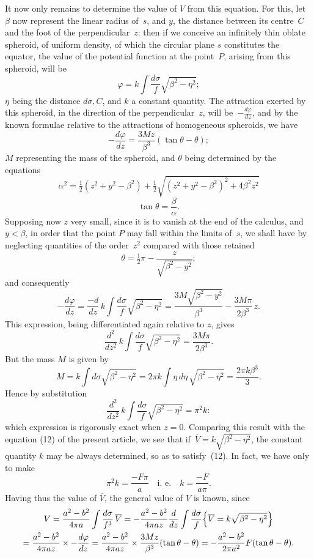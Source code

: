 \documentclass[12pt,notitlepage]{amsart}
\renewcommand{\phi}{\varphi}
\begin{document}
It now only remains to determine the value of $V$ from this equation.
For this, let $\beta$ now represent the linear radius of~$s$,
and $y$, the distance
between its centre~$C$ and the foot of the perpendicular~$z$:
then if we conceive
an infinitely thin oblate spheroid, of uniform density, of which the circular
plane $s$ constitutes the equator, the value of the potential function at the
point~$P$, arising from this spheroid, will be
\[
\phi=k\int\frac{d\sigma}{f}\sqrt{\beta^2-\eta^2};
\]
$\eta$ being the distance $d\sigma,C$, and $k$ a constant quantity.
The attraction exerted
by this spheroid, in the direction of the perpendicular~$z$,
will be~$-\frac{d\phi}{dz}$, and
by the known formulae relative to the attractions of homogeneous spheroids,
we have
\[
-\frac{d\phi}{dz}=\frac{3Mz}{\beta^3}(\tan\theta-\theta);
\]
$M$ representing the mass of the spheroid,
and $\theta$ being determined by the
equations
\[
\alpha^2=\tfrac12(z^2+y^2-\beta^2)
+\tfrac12\sqrt{(z^2+y^2-\beta^2)^2+4\beta^2z^2}
\]
\[
\tan\theta=\frac\beta\alpha.
\]
Supposing now $z$ very small, since it is to vanish at the end of the calculus,
and~$y<\beta$, in order that the point $P$ may fall within the limits of~$s$,
we shall
have by neglecting quantities of the order~$z^2$ compared with those retained
\[
\theta=\tfrac12\pi-\frac{z}{\sqrt{\beta^2-y^2}};
\]
and consequently
\[
-\frac{d\phi}{dz}
=\frac{-d}{dz}\,k\int\frac{d\sigma}{f}\sqrt{\beta^2-\eta^2}
=\frac{3M\sqrt{\beta^2-y^2}}{\beta^3}-\frac{3M\pi}{2\beta^3}\,z.
\]
This expression, being differentiated again relative to $z$, gives
\[
\frac{d^2}{dz^2}\,k\int\frac{d\sigma}{f}\sqrt{\beta^2-\eta^2}
=\frac{3M\pi}{2\beta^3}.
\]
But the mass $M$ is given by
\[
M=k\int d\sigma\sqrt{\beta^2-\eta^2}
=2\pi k\int \eta\,d\eta\,\sqrt{\beta^2-\eta^2}
=\frac{2\pi k\beta^3}{3}.
\]
Hence by substitution
\[
\frac{d^2}{dz^2}\,k\int\frac{d\sigma}{f}\sqrt{\beta^2-\eta^2}
=\pi^2k:
\]
which expression is rigorously exact when $z=0$. Comparing this result
with the equation (12) of the present article, we see that
if~$\overline{V}=k\sqrt{\beta^2-\eta^2}$,
the constant quantity $k$ may be always determined, so as to satisfy~(12).
In fact, we have only to make
\[
\pi^2k=\frac{-F\pi}{a}
\quad\text{i.~e.}\quad
k=\frac{-F}{a\pi}.
\]
Having thus the value of $\overline{V}$,
the general value of $V$ is known, since
\begin{multline*}
V=\frac{a^2-b^2}{4\pi a}\int\frac{d\sigma}{f^3}\,\overline{V}
=-\frac{a^2-b^2}{4\pi az}\frac{d}{dz}\int\frac{d\sigma}{f}
\Bigl\{\overline{V}=k\sqrt{\beta^2-\eta^2}\Bigr\}\\
=\frac{a^2-b^2}{4\pi az}\times-\frac{d\phi}{dz}
=\frac{a^2-b^2}{4\pi az}\times\frac{3Mz}{\beta^3}(\tan\theta-\theta)
=-\frac{a^2-b^2}{2\pi a^2}F(\tan\theta-\theta).
\end{multline*}
\end{document}
